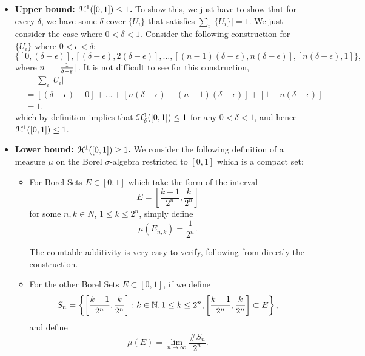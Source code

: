 \begin{itemize}
    \begin{itemize}
        \item \textbf{Upper bound: \(\mathcal{H}^1([0, 1]) \leq 1\).} To show this, we just have to show that for every \(\delta\), we have some \(\delta\)-cover \(\{U_i\}\) that satisfies \(\sum_{i}|\{U_i\}|=1\). We just consider the case where \(0 < \delta < 1\). Consider the following construction for \(\{U_i\}\) where \(0 < \epsilon < \delta\):
        \[
        \{[0, (\delta - \epsilon)], [(\delta - \epsilon), 2(\delta - \epsilon)], \ldots, [(n-1) (\delta - \epsilon), n(\delta - \epsilon)], [n(\delta - \epsilon), 1]\},
        \]
        where \(n = \lfloor\frac{1}{\delta - \varepsilon}\rfloor\). It is not difficult to see for this construction,
        \begin{align*}
            &\phantom{=}\sum_{i} |U_i|\\
            &= [(\delta - \epsilon) - 0] + \ldots + [n(\delta - \epsilon) - (n-1) (\delta - \epsilon)] + [1 - n(\delta - \epsilon)]\\
            &= 1.
        \end{align*}
        which by definition implies that \(\mathcal{H}_\delta^1([0, 1]) \leq 1\) for any \(0 < \delta < 1\), and hence \(\mathcal{H}^1([0, 1]) \leq 1\).
        \item \textbf{Lower bound: \(\mathcal{H}^1([0, 1]) \geq 1\).} We consider the following definition of a measure \(\mu\) on the Borel \(\sigma\)-algebra restricted to \([0, 1]\) which is a compact set:
        \begin{itemize}
            \item For Borel Sets \(E \in [0, 1]\) which take the form of the interval
            \[
            E  = \left[\frac{k - 1}{2^n}, \frac{k}{2^n}\right]
            \]
            for some \(n, k \in N\), \(1 \leq k \leq 2^n\), simply define
            \[
            \mu(E_{n, k}) = \frac{1}{2^n}.
            \]

            The countable additivity is very easy to verify, following from directly the construction.

            \item For the other Borel Sets \(E \subset [0, 1]\), if we define
            \[
            S_n = \left\{\left[\frac{k - 1}{2^n}, \frac{k}{2^n}\right] : k \in \mathbb{N}, 1 \leq k \leq 2^n, \left[\frac{k - 1}{2^n}, \frac{k}{2^n}\right] \subset E\right\},
            \]
            and define
            \[
            \mu(E) = \lim_{n \to \infty} \frac{\# S_n}{2^n}.
            \]
        \end{itemize}


\end{itemize}
\end{itemize}
